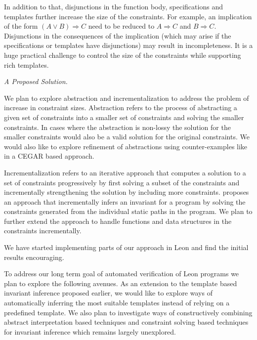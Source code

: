 In addition to that, disjunctions in the function body, specifications and templates further increase the size of the constraints.
For example, an implication of the form $(A \vee B) \Rightarrow C$
need to be reduced to $A \Rightarrow C$ and $B \Rightarrow C$.
Disjunctions in the consequences of the implication (which may arise if the
specifications or templates have disjunctions) may result in incompleteness.
It is a huge practical challenge to control the size of the constraints while supporting rich templates.

\emph{A Proposed Solution.}

We plan to explore abstraction and incrementalization to address the problem of increase in constraint sizes.
Abstraction refers to the process of abstracting a given set of constraints into a smaller set of constraints and solving the smaller constraints. 
In cases where the abstraction is non-lossy the solution for the 
smaller constraints would also be a valid  solution for the original constraints.
We would also like to explore refinement of abstractions using counter-examples
like in a CEGAR based approach.

Incrementalization refers to an iterative approach that computes a solution to a set of constraints progressively by first solving a subset of the constraints 
and incrementally strengthening the solution by including more constraints.
\cite{dirk:PLDI07} proposes an approach that incrementally infers an invariant for a program by solving the constraints generated from the individual static paths in the program.
We plan to further extend the approach to handle functions and data structures 
in the constraints incrementally.

We have started implementing parts of our approach in Leon and find the initial results encouraging. 

To address our long term goal of automated verification of Leon programs we plan to explore the following avenues. As an extension to the template based invariant inference proposed earlier, we would like to explore ways of 
automatically inferring the most suitable templates instead of relying on a predefined template. We also plan to investigate ways of constructively combining abstract interpretation based techniques and constraint solving based techniques for invariant inference which remains largely unexplored.

